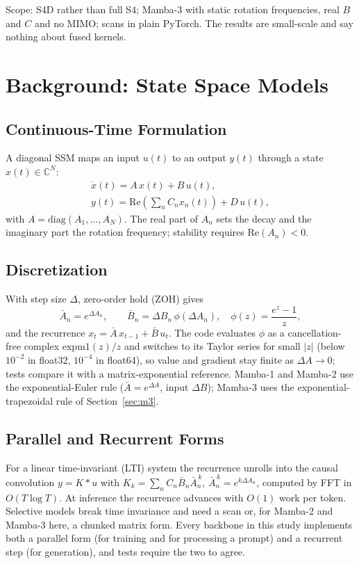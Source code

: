 \documentclass[conference]{IEEEtran}
\newcommand{\mamba}{Mamba}
\begin{document}
Scope: S4D rather than full S4; \mamba{}-3 with static rotation
frequencies, real $B$ and $C$ and no MIMO; scans in plain PyTorch. The
results are small-scale and say nothing about fused kernels.

\section{Background: State Space Models}

\subsection{Continuous-Time Formulation}
A diagonal SSM maps an input $u(t)$ to an output $y(t)$ through a state
$x(t)\in\mathbb{C}^{N}$:
\begin{equation}
\begin{gathered}
\dot{x}(t) = A\,x(t) + B\,u(t),\\
y(t) = \mathrm{Re}\!\left(\textstyle\sum_{n} C_n x_n(t)\right) + D\,u(t),
\end{gathered}
\label{eq:cont}
\end{equation}
with $A=\mathrm{diag}(A_1,\dots,A_N)$. The real part of $A_n$ sets the decay
and the imaginary part the rotation frequency; stability requires
$\mathrm{Re}(A_n)<0$.

\subsection{Discretization}
With step size $\Delta$, zero-order hold (ZOH) gives
\begin{equation}
\bar{A}_n = e^{\Delta A_n}, \qquad
\bar{B}_n = \Delta B_n \,\phi(\Delta A_n), \quad \phi(z) = \frac{e^{z}-1}{z},
\label{eq:zoh}
\end{equation}
and the recurrence $x_t = \bar{A}\,x_{t-1} + \bar{B}\,u_t$. The code evaluates
$\phi$ as a cancellation-free complex $\mathrm{expm1}(z)/z$ and switches to its
Taylor series for small $|z|$ (below $10^{-2}$ in float32, $10^{-4}$ in
float64), so value and gradient stay finite as $\Delta A\to0$; tests compare it
with a matrix-exponential reference. \mamba{}-1 and \mamba{}-2 use the
exponential-Euler rule ($\bar A=e^{\Delta A}$, input $\Delta B$); \mamba{}-3
uses the exponential-trapezoidal rule of Section~\ref{sec:m3}.

\subsection{Parallel and Recurrent Forms}
For a linear time-invariant (LTI) system the recurrence unrolls into the
causal convolution $y=K*u$ with
$K_k = \sum_n C_n \bar{B}_n \bar{A}_n^{\,k}$, $\bar{A}_n^{\,k}=e^{k\Delta A_n}$,
computed by FFT in $O(T\log T)$. At inference the recurrence advances with
$O(1)$ work per token. Selective models break time invariance and need a scan
or, for \mamba{}-2 and \mamba{}-3 here, a chunked matrix form. Every backbone in
this study implements both a parallel form (for training and for processing a
prompt) and a recurrent step (for generation), and tests require the two to
agree.
\end{document}
